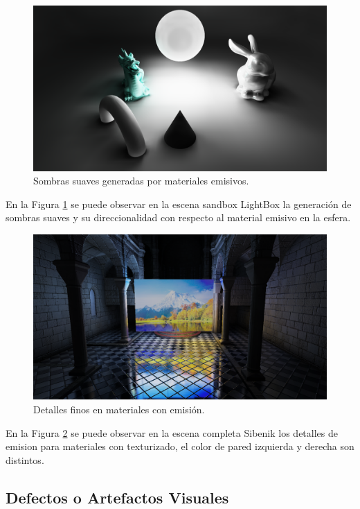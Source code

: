 \begin{figure}[H]
	\centering
	\includegraphics[width=.9\linewidth]{media/finals/area_shadows.png}
	\caption{Sombras suaves generadas por materiales emisivos.}
	\label{fig:areashadows}
\end{figure}
En la Figura \ref{fig:areashadows} se puede observar en la escena sandbox LightBox la generación de sombras suaves y su direccionalidad con respecto al material emisivo en la esfera.

\begin{figure}[H]
	\centering
	\includegraphics[width=.9\linewidth]{media/finals/fine_emissive.png}
	\caption{Detalles finos en materiales con emisión.}
	\label{fig:fine_emissive}
\end{figure}
En la Figura \ref{fig:fine_emissive} se puede observar en la escena completa Sibenik los detalles de emision para materiales con texturizado, el color de pared izquierda y derecha son distintos.
\subsection{Defectos o Artefactos Visuales} %
\label{sub:defectos_o_artefactos_visuales}

